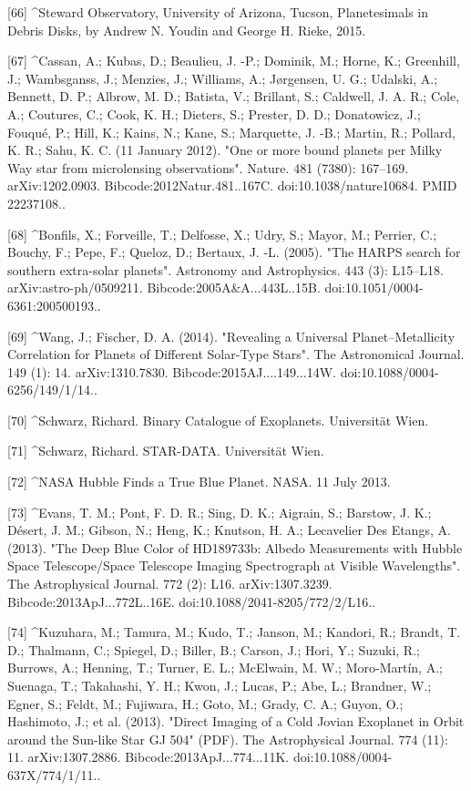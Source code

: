 [66]
^Steward Observatory, University of Arizona, Tucson, Planetesimals in Debris Disks, by Andrew N. Youdin and George H. Rieke, 2015.

[67]
^Cassan, A.; Kubas, D.; Beaulieu, J. -P.; Dominik, M.; Horne, K.; Greenhill, J.; Wambsganss, J.; Menzies, J.; Williams, A.; Jørgensen, U. G.; Udalski, A.; Bennett, D. P.; Albrow, M. D.; Batista, V.; Brillant, S.; Caldwell, J. A. R.; Cole, A.; Coutures, C.; Cook, K. H.; Dieters, S.; Prester, D. D.; Donatowicz, J.; Fouqué, P.; Hill, K.; Kains, N.; Kane, S.; Marquette, J. -B.; Martin, R.; Pollard, K. R.; Sahu, K. C. (11 January 2012). "One or more bound planets per Milky Way star from microlensing observations". Nature. 481 (7380): 167–169. arXiv:1202.0903. Bibcode:2012Natur.481..167C. doi:10.1038/nature10684. PMID 22237108..

[68]
^Bonfils, X.; Forveille, T.; Delfosse, X.; Udry, S.; Mayor, M.; Perrier, C.; Bouchy, F.; Pepe, F.; Queloz, D.; Bertaux, J. -L. (2005). "The HARPS search for southern extra-solar planets". Astronomy and Astrophysics. 443 (3): L15–L18. arXiv:astro-ph/0509211. Bibcode:2005A&A...443L..15B. doi:10.1051/0004-6361:200500193..

[69]
^Wang, J.; Fischer, D. A. (2014). "Revealing a Universal Planet–Metallicity Correlation for Planets of Different Solar-Type Stars". The Astronomical Journal. 149 (1): 14. arXiv:1310.7830. Bibcode:2015AJ....149...14W. doi:10.1088/0004-6256/149/1/14..

[70]
^Schwarz, Richard. Binary Catalogue of Exoplanets. Universität Wien.

[71]
^Schwarz, Richard. STAR-DATA. Universität Wien.

[72]
^NASA Hubble Finds a True Blue Planet. NASA. 11 July 2013.

[73]
^Evans, T. M.; Pont, F. D. R.; Sing, D. K.; Aigrain, S.; Barstow, J. K.; Désert, J. M.; Gibson, N.; Heng, K.; Knutson, H. A.; Lecavelier Des Etangs, A. (2013). "The Deep Blue Color of HD189733b: Albedo Measurements with Hubble Space Telescope/Space Telescope Imaging Spectrograph at Visible Wavelengths". The Astrophysical Journal. 772 (2): L16. arXiv:1307.3239. Bibcode:2013ApJ...772L..16E. doi:10.1088/2041-8205/772/2/L16..

[74]
^Kuzuhara, M.; Tamura, M.; Kudo, T.; Janson, M.; Kandori, R.; Brandt, T. D.; Thalmann, C.; Spiegel, D.; Biller, B.; Carson, J.; Hori, Y.; Suzuki, R.; Burrows, A.; Henning, T.; Turner, E. L.; McElwain, M. W.; Moro-Martín, A.; Suenaga, T.; Takahashi, Y. H.; Kwon, J.; Lucas, P.; Abe, L.; Brandner, W.; Egner, S.; Feldt, M.; Fujiwara, H.; Goto, M.; Grady, C. A.; Guyon, O.; Hashimoto, J.; et al. (2013). "Direct Imaging of a Cold Jovian Exoplanet in Orbit around the Sun-like Star GJ 504" (PDF). The Astrophysical Journal. 774 (11): 11. arXiv:1307.2886. Bibcode:2013ApJ...774...11K. doi:10.1088/0004-637X/774/1/11..

